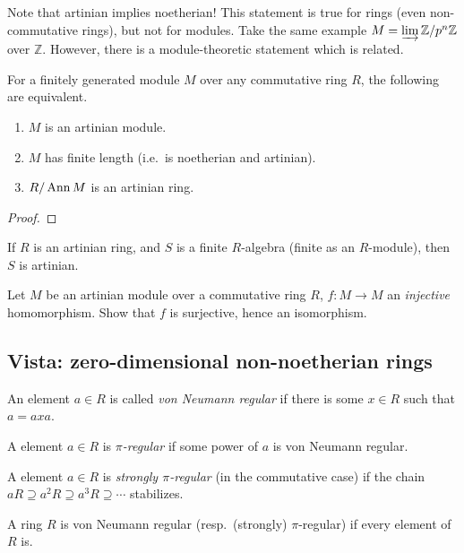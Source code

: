 \begin{remark}
 Note that artinian implies noetherian! This statement is true for rings (even
 non-commutative rings), but not for modules. Take the same example $M = \varinjlim
   \mathbb{Z}/p^n\mathbb{Z}$ over $\mathbb{Z}$. However, there is a module-theoretic statement which is
   related.
 \end{remark}
 \begin{corollary}
   For a finitely generated module $M$ over any commutative ring $R$, the following are
   equivalent.
   \begin{enumerate}
     \item $M$ is an artinian module.
     \item $M$ has finite length (i.e.\ is noetherian and artinian).
     \item $R/\operatorname{Ann} M$ is an artinian ring.
   \end{enumerate}
 \end{corollary}
\begin{proof} 
\end{proof} 
\begin{exercise} 
If $R$ is an artinian ring, and $S$ is a finite $R$-algebra (finite as an
$R$-module), then $S$ is artinian.
\end{exercise} 

\begin{exercise} 
Let $M$ be an artinian module over a commutative ring $R$, $f: M \to M$ an \emph{injective} homomorphism.
Show that $f$ is surjective, hence an isomorphism. 
\end{exercise} 


\subsection{Vista: zero-dimensional non-noetherian rings}
 \begin{definition}
   An element $a\in R$ is called \emph{von Neumann regular} if there is some $x\in R$
   such that $a=axa$.
 \end{definition}
 \begin{definition}[McCoy]
   A element $a\in R$ is \emph{$\pi$-regular} if some power of $a$ is von Neumann
   regular.
 \end{definition}
 \begin{definition}
   A element $a\in R$ is \emph{strongly $\pi$-regular} (in the commutative case)
   if the chain $aR\supseteq a^2R\supseteq a^3R\supseteq \cdots$ stabilizes.
 \end{definition}
 A ring $R$ is von Neumann regular (resp.\ (strongly) $\pi$-regular) if every element of
 $R$ is.

